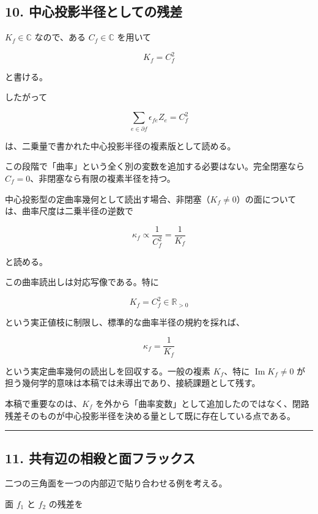 \documentclass[
  a4paper,
]{ltjsarticle}
\begin{document}
\subsection{10.
中心投影半径としての残差}\label{ux4e2dux5fc3ux6295ux5f71ux534aux5f84ux3068ux3057ux3066ux306eux6b8bux5dee}

\(K_f\in\mathbb C\) なので、ある \(C_f\in\mathbb C\) を用いて

\[
\boxed{K_f=C_f^2}
\]

と書ける。

したがって

\[
\sum_{e\in\partial f}\epsilon_{fe}Z_e=C_f^2
\]

は、二乗量で書かれた中心投影半径の複素版として読める。

この段階で「曲率」という全く別の変数を追加する必要はない。完全閉塞なら
\(C_f=0\)、非閉塞なら有限の複素半径を持つ。

中心投影型の定曲率幾何として読出す場合、非閉塞（\(K_f\neq0\)）の面については、曲率尺度は二乗半径の逆数で

\[
\kappa_f\propto \frac{1}{C_f^2}=\frac{1}{K_f}
\]

と読める。

この曲率読出しは対応写像である。特に

\[
K_f=C_f^2\in\mathbb R_{>0}
\]

という実正値枝に制限し、標準的な曲率半径の規約を採れば、

\[
\kappa_f=\frac{1}{K_f}
\]

という実定曲率幾何の読出しを回収する。一般の複素 \(K_f\)、特に
\(\operatorname{Im}K_f\neq0\)
が担う幾何学的意味は本稿では未導出であり、接続課題として残す。

本稿で重要なのは、\(K_f\)
を外から「曲率変数」として追加したのではなく、閉路残差そのものが中心投影半径を決める量として既に存在している点である。

\begin{center}\rule{0.5\linewidth}{0.5pt}\end{center}

\subsection{11.
共有辺の相殺と面フラックス}\label{ux5171ux6709ux8fbaux306eux76f8ux6bbaux3068ux9762ux30d5ux30e9ux30c3ux30afux30b9}

二つの三角面を一つの内部辺で貼り合わせる例を考える。

面 \(f_1\) と \(f_2\) の残差を
\end{document}
